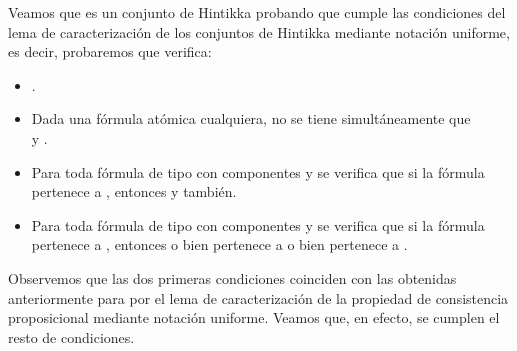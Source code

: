 \begin{isabellebody}
\begin{isamarkuptext}
\begin{demostracion}
    Veamos que  es un conjunto de Hintikka probando que cumple las condiciones del
    lema de caracterización de los conjuntos de Hintikka mediante notación uniforme, es decir,
    probaremos que  verifica:

    \begin{itemize}
      \item {}.
      \item Dada  una fórmula atómica cualquiera, no se tiene 
      simultáneamente que\\  y .
      \item Para toda fórmula de tipo \isa{{\isasymalpha}} con componentes  y  se verifica 
      que si la fórmula pertenece a , entonces  y  también.
      \item Para toda fórmula de tipo \isa{{\isasymbeta}} con componentes  y  se verifica 
      que si la fórmula pertenece a , entonces o bien  pertenece
      a  o bien  pertenece a .
    \end{itemize} 

    Observemos que las dos primeras condiciones coinciden con las obtenidas anteriormente para  
    por el lema de caracterización de la propiedad de consistencia proposicional mediante notación
    uniforme. Veamos que, en efecto, se cumplen el resto de condiciones.


\end{demostracion}
\end{isamarkuptext}
\end{isabellebody}
